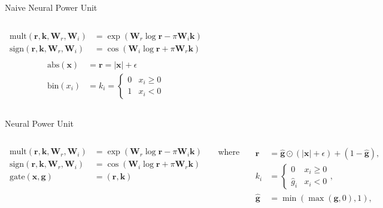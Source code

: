 \documentclass[aspectratio=169,professionalfont,xcolor={dvipsnames},hyperref={colorlinks=true,urlcolor=MidnightBlue}]{beamer}
\newcommand{\abs}{\,\mathrm{abs}}
\newcommand{\bin}{\,\mathrm{bin}}
\newcommand{\sign}{\,\mathrm{sign}}
\newcommand{\mult}{\,\mathrm{mult}}
\newcommand{\gate}{\,\mathrm{gate}}
\newcommand{\Wre}{\bm W_r}
\newcommand{\Wim}{\bm W_i}
\begin{document}
\begin{frame}{Naive Neural Power Unit}
  \begin{columns}
    

    \begin{align*}
      \mult(\bm r,\bm k,\Wre,\Wim) &= \exp(\Wre \log \bm r - \pi\Wim \bm k) \\
      \sign(\bm r,\bm k,\Wre,\Wim) &= \cos(\Wim \log \bm r + \pi\Wre \bm k) \\
    \end{align*}
    \begin{align*}
      \abs(\bm x)              &= \bm r = |\bm x| + \epsilon \\
      \bin(x_i)            &= k_i = \begin{cases}
         0  & x_i \geq 0 \\
         1 & x_i < 0
      \end{cases}
    \end{align*}

  \end{columns}
\end{frame}


\begin{frame}{Neural Power Unit}
  \begin{columns}
      

      \begin{align*}
        \mult(\bm r,\bm k,\Wre,\Wim) &= \exp(\Wre \log \bm r - \pi\Wim \bm k) \\
        \sign(\bm r,\bm k,\Wre,\Wim) &= \cos(\Wim \log \bm r + \pi\Wre \bm k) \\
        \gate(\bm x,\bm g)           &= (\bm r,\bm k) \\
      \end{align*}
      \begin{center} where \end{center}
      \begin{align*}
        \bm r &= \hat{\bm g} \odot (|\bm x|+\epsilon) + (1-\hat{\bm g}), \\
        k_i &= \begin{cases}
           0  & x_i \geq 0 \\
          \hat g_i & x_i < 0
        \end{cases},\\
        \hat{\bm g} &= \min(\max(\bm g,0),1),
      \end{align*}
  \end{columns}
\end{frame}
\end{document}
